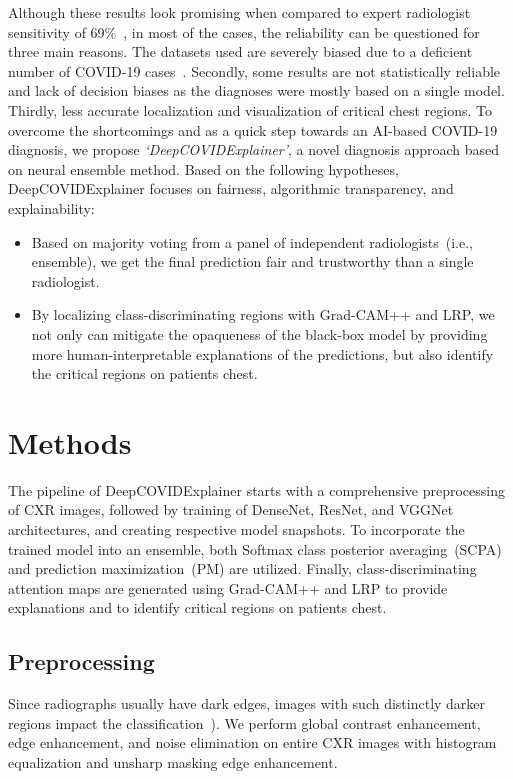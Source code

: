 \documentclass[conference]{IEEEtran}
\begin{document}
Although these results look promising when compared to expert radiologist sensitivity of 69\%~\cite{tabik2020covidgr}, in most of the cases, the reliability can be questioned for three main reasons. The datasets used are severely biased due to a deficient number of COVID-19 cases~\cite{tabik2020covidgr}. Secondly, some results are not statistically reliable and lack of decision biases as the diagnoses were mostly based on a single model. Thirdly, less accurate localization and visualization of critical chest regions.
\fi 
To overcome the shortcomings and as a quick step towards an AI-based COVID-19 diagnosis, we propose \emph{`DeepCOVIDExplainer'}, a novel diagnosis approach based on neural ensemble method. 
Based on the following hypotheses, DeepCOVIDExplainer focuses on fairness, algorithmic transparency, and explainability:

\begin{itemize}
    \item Based on majority voting from a panel of independent radiologists~(i.e., ensemble), we get the final prediction fair and trustworthy than a single radiologist.
    \item By localizing class-discriminating regions with Grad-CAM++ and LRP, we not only can mitigate the opaqueness of the black-box model by providing more human-interpretable explanations of the predictions, but also identify the critical regions on patients chest.
\end{itemize}

\section{Methods}
\label{sec:mm}
The pipeline of DeepCOVIDExplainer starts with a comprehensive preprocessing of CXR images, followed by training of DenseNet, ResNet, and VGGNet architectures, and creating respective model snapshots. To incorporate the trained model into an ensemble, both Softmax class posterior averaging~(SCPA) and prediction maximization~(PM) are utilized. Finally, class-discriminating attention maps are generated using Grad-CAM++ and LRP to provide explanations and to identify critical regions on patients chest.

\subsection{Preprocessing}
Since radiographs usually have dark edges, images with such distinctly darker regions impact the  classification~\cite{86}). 
We perform global contrast enhancement, edge enhancement, and noise elimination on entire CXR images with histogram equalization and unsharp masking edge enhancement. %
\end{document}
